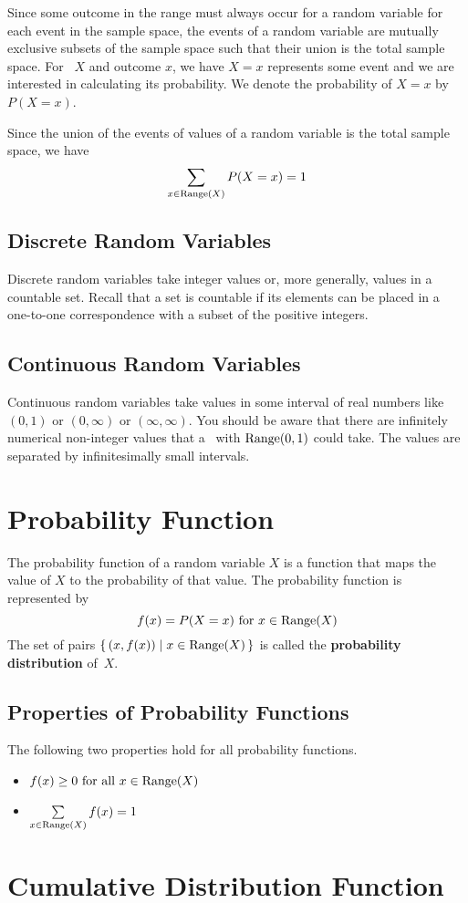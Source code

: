 Since some outcome in the range must always occur for a random variable for each event in the sample space, the events of a random variable are mutually exclusive subsets of the sample space such that their union is the total sample space. For \rv~$X$ and outcome $x$, we have $X = x$ represents some event and we are interested in calculating its probability. We denote the probability of $X = x$ by $P(X = x)$.
\begin{info}
Since the union of the events of values of a random variable is the total sample space, we have
\[
    \sum_{x \in \operatorname{Range}(X)} P(X=x) = 1
\]
\end{info}
\subsection*{Discrete Random Variables}
Discrete random variables take integer values or, more generally, values in a countable set. Recall that a set is countable if its elements can be placed in a one-to-one correspondence with a subset of the positive integers.
\subsection*{Continuous Random Variables}
Continuous random variables take values in some interval of real numbers like $(0,1)$ or $(0,\infty)$ or $(\infty,\infty)$. You should be aware that there are infinitely numerical non-integer values that a \rv~with $\operatorname{Range}(0,1)$ could take. The values are separated by infinitesimally small intervals.
\section{Probability Function}
The probability function of a random variable $X$ is a function that maps the value of $X$ to the probability of that value. The probability function is represented by 
\[
    f(x) = P(X = x)\text{ for } x\in\operatorname{Range}(X)
\]
The set of pairs $\{\, (x,f(x)) \mid x\in\operatorname{Range}(X) \,\}$ is called the \textbf{probability distribution} of~$X$.

\subsection*{Properties of Probability Functions}
The following two properties hold for all probability functions.
\begin{itemize}
    \item $f(x) \geq 0 \text{ for }\text{all } x\in\operatorname{Range}(X)$
    \item $\sum\limits_{x\in\operatorname{Range}(X)} f(x) = 1$
\end{itemize}
\section{Cumulative Distribution Function}
\lipsum[3]

